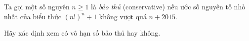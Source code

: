 \ifshowproblem
\begin{problem}\label{example:ROM-2015-P3}
    Ta gọi một số nguyên \( n \ge 1 \) là \textit{bảo thủ} (conservative)
    nếu ước số nguyên tố nhỏ nhất của biểu thức \( (n!)^n + 1 \) không vượt quá \( n + 2015 \).

    Hãy xác định xem có vô hạn số bảo thủ hay không.
\end{problem}
\fi

\fi